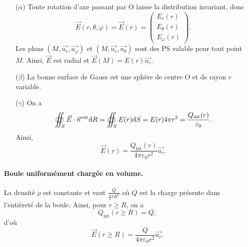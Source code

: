             \begin{itemize}
                \item [($\alpha$)] Toute rotation d'axe passant par O laisse la distribution invariant, donc 
                \begin{equation}
                    \vec{E}(r,\theta,\varphi)=\vec{E}(r)=\begin{pmatrix}
                        E_r(r)\\ E_{\theta}(r)\\E_{\varphi}(r)
                    \end{pmatrix}.
                \end{equation}
                Les plans $(M,\vec{u_r},\vec{u_{\varphi}})$ et $(M,\vec{u_r},\vec{u_{\theta}})$ sont des PS valable pour tout point $M$. Ainsi, $\vec{E}$ est radial et $\vec{E}(M)=E(r)\vec{u_r}$.
                \item [($\beta$)] La bonne surface de Gauss est une sphère de centre $O$ et de rayon $r$ variable.
                \item [($\gamma$)] On a 
                \begin{equation}
                    \oiint_{S}\vec{E}\cdot\vec{n}^{\text{ext}}\mathrm{d} R=\oiint_{S}E(r)\mathrm{d} S=E(r)4\pi r^{2}=\frac{Q_{\text{int}}(r)}{\varepsilon_{0}}.
                \end{equation}
                Ainsi,
                \begin{equation}
                    \boxed{
                        \vec{E}(r)=\frac{Q_{\text{int}}(r)}{4\pi\varepsilon_{0}r^{2}}\vec{u_r}.
                    }
                \end{equation}
            \end{itemize}

            \paragraph{Boule uniformément chargée en volume.}

                La densité $\rho$ est constante et vaut $\frac{Q}{\frac{4}{3}\pi R^{3}}$ où $Q$ est la charge présente dans l'entièreté de la boule. Ainsi, pour $r\geqslant R$, on a 
                \begin{equation}
                    Q_{\text{int}}(r\geqslant R)=Q,
                \end{equation}
                d'où
                \begin{equation}
                    \boxed{
                        \vec{E}(r\geqslant R)=\frac{Q}{4\pi\varepsilon_0 r^{2}}\vec{u_r}.
                    }
                \end{equation}

